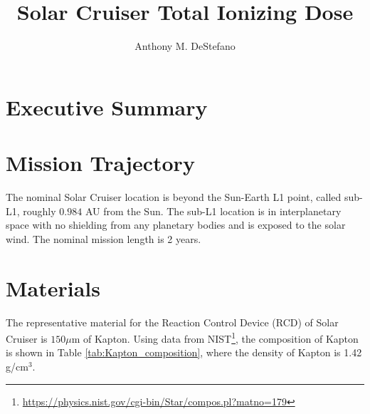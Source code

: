 \documentclass{hitec}
\title{Solar Cruiser Total Ionizing Dose}
\author{Anthony M. DeStefano}
\begin{document}
\maketitle
{}

\tableofcontents
\listoffigures
\listoftables
\lstlistoflistings
\newpage






\cleardoublepage
{}
\section{Executive Summary}





\newpage
\section{Mission Trajectory}

The nominal Solar Cruiser location is beyond the Sun-Earth L1 point, called sub-L1, roughly $0.984$ AU from the Sun. The sub-L1 location is in interplanetary space with no shielding from any planetary bodies and is exposed to the solar wind. The nominal mission length is 2 years.

\section{Materials}

The representative material for the Reaction Control Device (RCD) of Solar Cruiser is $150 \mu\text{m}$ of Kapton. Using data from NIST\footnote{\url{https://physics.nist.gov/cgi-bin/Star/compos.pl?matno=179}}, the composition of Kapton is shown in Table \ref{tab:Kapton_composition}, where the density of Kapton is 1.42 g/cm$^3$.
\end{document}
